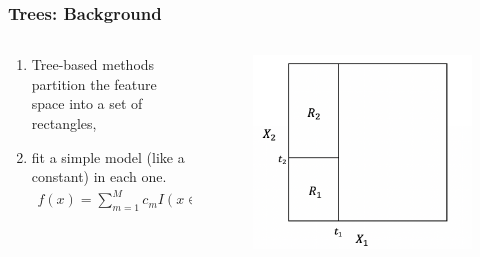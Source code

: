 \documentclass[
  shownotes,
  xcolor={svgnames},
  hyperref={colorlinks,citecolor=DarkBlue,linkcolor=DarkRed,urlcolor=DarkBlue}
  ]{beamer}
\begin{document}
\begin{frame}[fragile]
\frametitle{Trees: Background}


\begin{columns}[T] %
\begin{column}{.42\textwidth}
  
\begin{enumerate}
\item Tree-based methods partition the feature space into a set of rectangles,
\item  fit a simple model (like a constant) in each one. 
\begin{align}
f(x) = \sum_{m=1}^M c_m I(x\in R_m)
\end{align}
\end{enumerate}


\end{column}  
\hfill
\begin{column}{.48\textwidth}

 \begin{figure}[H] \centering
            \captionsetup{justification=centering}
              \includegraphics[scale=0.4]{figures/cart_3}                           
 \end{figure}

\end{column}
\end{columns}
\end{frame}
\end{document}
